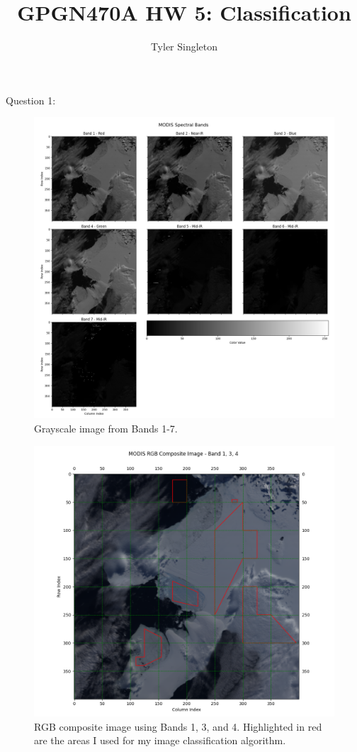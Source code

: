 \documentclass{homework}
\title{GPGN470A HW 5: Classification}
\author{Tyler Singleton}
\begin{document}
\maketitle

Question 1: \\ 

\begin{figure}[H]
    \centering
    \includegraphics[width=\textwidth]{images/MODIS-GrayScale.png}
    \caption{Grayscale image from Bands 1-7.}
    \label{fig:GrayScale}
\end{figure}

\begin{figure}[H]
    \centering
    \includegraphics[width=\textwidth]{images/MODIS-RGB.png}
    \caption{RGB composite image using Bands 1, 3, and 4. Highlighted in red are the areas I used for my image classification algorithm.}
    \label{fig:RGB}
\end{figure}
\end{document}
